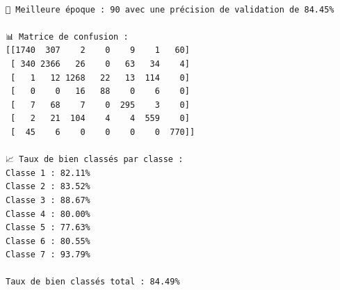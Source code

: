 \documentclass[
]{article}
\begin{document}
\begin{verbatim}

🔹 Meilleure époque : 90 avec une précision de validation de 84.45%

📊 Matrice de confusion :
[[1740  307    2    0    9    1   60]
 [ 340 2366   26    0   63   34    4]
 [   1   12 1268   22   13  114    0]
 [   0    0   16   88    0    6    0]
 [   7   68    7    0  295    3    0]
 [   2   21  104    4    4  559    0]
 [  45    6    0    0    0    0  770]]

📈 Taux de bien classés par classe :
Classe 1 : 82.11%
Classe 2 : 83.52%
Classe 3 : 88.67%
Classe 4 : 80.00%
Classe 5 : 77.63%
Classe 6 : 80.55%
Classe 7 : 93.79%

Taux de bien classés total : 84.49%
\end{verbatim}
\end{document}
